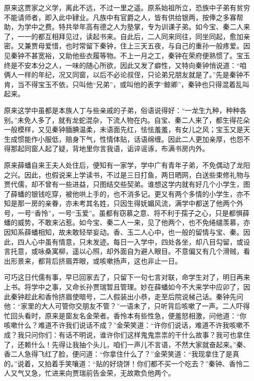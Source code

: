 \documentclass[12pt,oneside]{book}
\begin{document}
原来这贾家之义学，离此不远，不过一里之遥。原系始祖所立，恐族中子弟有贫穷不能请师者，即入此中肄业。凡族中有官爵之人，皆有供给银两，按俸之多寡帮助，为学中之费。特共举年高有德之人为塾掌，专为训课子弟。如今宝、秦二人来了，一一的都互相拜见过，读起书来。自此后，二人同来同往，同坐同起，愈加亲密。又兼贾母爱惜，也时常留下秦钟，住上三天五夜，与自己的重孙一般疼爱。因见秦钟不甚宽裕，又助他些衣履等物。不上一月之工，秦钟在荣府便熟惯了。宝玉终是不安本分之人，一味的随心所欲，因此又发了癖性，又特向秦钟悄说道：“咱俩人一样的年纪，况又同窗，以后不必论叔侄，只论弟兄朋友就是了。”先是秦钟不肯，当不得宝玉不依，只叫他“兄弟”，或叫他的表字“鲸卿”，秦钟也只得混着乱叫起来。

原来这学中虽都是本族人丁与些亲戚的子弟，俗语说得好：“一龙生九种，种种各别。”未免人多了，就有龙蛇混杂，下流人物在内。自宝、秦二人来了，都生得花朵一般模样，又见秦钟腼腆温柔，未语面先红，怯怯羞羞，有女儿之风；宝玉又是天生成惯能作小服低，赔身下气，性情体贴，话语绵缠。因此二人更加亲厚，也怨不得那起同窗人起了疑，背地里你言我语，诟谇谣诼，布满书房内外。

原来薛蟠自来王夫人处住后，便知有一家学，学中广有青年子弟，不免偶动了龙阳之兴。因此，也假说来上学读书，不过是三日打鱼，两日晒网，白送些束修礼物与贾代儒，却不曾有一些进益，只图结交些契弟。谁想这学内就有好几个小学生，图了薛蟠的银钱吃穿，被他哄上手的，也不消多记。更又有两个多情的小学生，亦不知是那一房的亲眷，亦未考其名姓，只因生得妩媚风流，满学中都送了他两个外号，一号“香怜”，一号“玉爱”。虽都有窃慕之意、将不利于孺子之心，只是都惧薛蟠的威势，不敢来沾惹。如今宝、秦二人一来，见了他两个，也不免绻缱羡慕，亦因知系薛蟠相知，故未敢轻举妄动。香、玉二人心中，也一般的留情与宝、秦。因此，四人心中虽有情意，只未发迹。每日一入学中，四处各坐，却八目勾留，或设言托意，或咏桑寓柳，遥以心照，却外面自为避人眼目。不意偏又有几个滑贼，看出形景来，都背后挤眉弄眼，或咳嗽扬声，这也非止一日。

可巧这日代儒有事，早已回家去了，只留下一句七言对联，命学生对了，明日再来上书。将学中之事，又命长孙贾瑞暂且管理。妙在薛蟠如今不大来学中应卯了，因此秦钟趁此和香怜挤眉使暗号，二人假装出小恭，走至后院说梯己话。秦钟先问他：“家里的大人可管你交朋友不管？”一语未了，只听背后咳嗽了一声。二人吓得忙回头看时，原来是窗友名金荣者。香怜本有些性急，便羞怒相激，问他道：“你咳嗽什么？难道不许我们说话不成？”金荣笑道：“许你们说话，难道不许我咳嗽不成？我只问你们：有话不明说，谁许你们这样鬼鬼祟祟的干什么故事？我可也拿住了，还赖什么！先得让我抽个头儿，咱们一声儿不言语，不然大家就奋起来。”秦、香二人急得飞红了脸，便问道：“你拿住什么了？”金荣笑道：“我现拿住了是真的。”说着，又拍着手笑嚷道：“贴的好烧饼！你们都不买一个吃去？”秦钟、香怜二人又气又急，忙进来向贾瑞前告金荣，无故欺负他两个。
\end{document}
